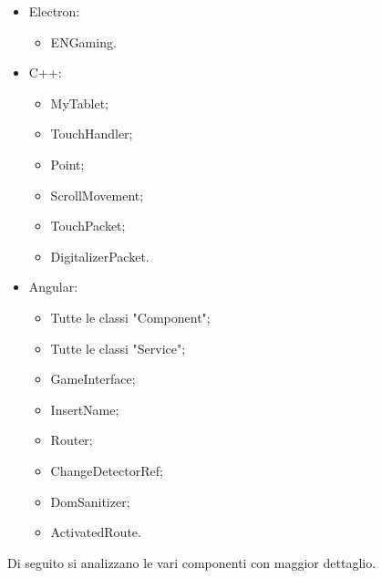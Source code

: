 \begin{itemize}
    \item Electron: \begin{itemize}
        \item ENGaming.
    \end{itemize}
    \item C++: \begin{itemize}
        \item MyTablet;
        \item TouchHandler;
        \item Point;
        \item ScrollMovement;
        \item TouchPacket;
        \item DigitalizerPacket.
    \end{itemize}
    \item Angular: \begin{itemize}
        \item Tutte le classi "Component";
        \item Tutte le classi "Service";
        \item GameInterface;
        \item InsertName;
        \item Router;
        \item ChangeDetectorRef;
        \item DomSanitizer;
        \item ActivatedRoute.
    \end{itemize}
\end{itemize}
Di seguito si analizzano le vari componenti con maggior dettaglio.
\newpage
